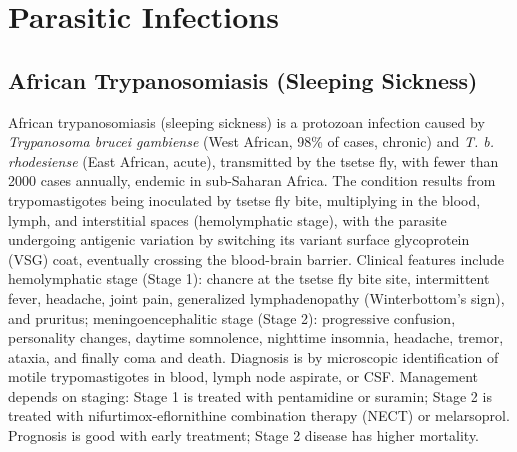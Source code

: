 \section{Parasitic Infections}








\label{sec:Parasitic Infections}

\subsection{African Trypanosomiasis (Sleeping Sickness)}
\label{sec:African Trypanosomiasis}
African trypanosomiasis (sleeping sickness) is a protozoan infection caused by \textit{Trypanosoma brucei gambiense} (West African, 98\% of cases, chronic) and \textit{T. b. rhodesiense} (East African, acute), transmitted by the tsetse fly, with fewer than 2000 cases annually, endemic in sub-Saharan Africa. The condition results from trypomastigotes being inoculated by tsetse fly bite, multiplying in the blood, lymph, and interstitial spaces (hemolymphatic stage), with the parasite undergoing antigenic variation by switching its variant surface glycoprotein (VSG) coat, eventually crossing the blood-brain barrier. Clinical features include hemolymphatic stage (Stage 1): chancre at the tsetse fly bite site, intermittent fever, headache, joint pain, generalized lymphadenopathy (Winterbottom's sign), and pruritus; meningoencephalitic stage (Stage 2): progressive confusion, personality changes, daytime somnolence, nighttime insomnia, headache, tremor, ataxia, and finally coma and death. Diagnosis is by microscopic identification of motile trypomastigotes in blood, lymph node aspirate, or CSF. Management depends on staging: Stage 1 is treated with pentamidine or suramin; Stage 2 is treated with nifurtimox-eflornithine combination therapy (NECT) or melarsoprol. Prognosis is good with early treatment; Stage 2 disease has higher mortality.

